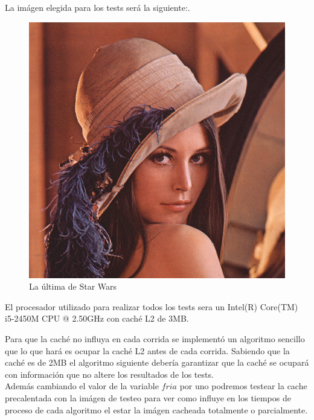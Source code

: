 La imágen elegida para los tests será la siguiente:.

\newpage

\begin{figure}
  \begin{center}
	\includegraphics[scale=.5]{imagenes/lena32.jpg}
	\caption{La última de Star Wars}
	\label{lena}
  \end{center}
\end{figure}

El procesador utilizado para realizar todos los tests sera un Intel(R) Core(TM) i5-2450M CPU @ 2.50GHz con caché L2 de 3MB.

Para que la caché no influya en cada corrida se implementó un algoritmo sencillo que lo que hará es ocupar la caché L2 antes de cada corrida. Sabiendo que la caché es de 2MB el algoritmo siguiente debería garantizar que la caché se ocupará con información que no altere los resultados de los tests. \\
Además cambiando el valor de la variable $fria$ por uno podremos testear la cache precalentada con la imágen de testeo para ver como influye en los tiempos de proceso de cada algoritmo el estar la imágen cacheada totalmente o parcialmente.

